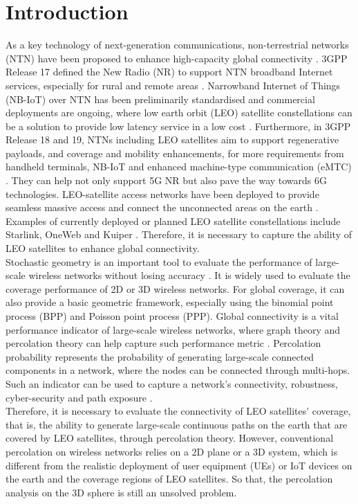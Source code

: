 \documentclass[final]{IEEEtran}
\begin{document}
\section{Introduction} \label{sec:Intro}

As a key technology of next-generation communications, non-terrestrial networks (NTN) have been proposed to enhance high-capacity global connectivity \cite{giordani2020non}. 3GPP Release 17 defined the New Radio (NR) to support NTN broadband Internet services, especially for rural and remote areas \cite{3GPPRelease17}. Narrowband Internet of Things (NB-IoT) over NTN has been preliminarily standardised and commercial deployments are ongoing, where low earth orbit (LEO) satellite constellations can be a solution to provide low latency service in a low cost \cite{3GPPRelease18,liberg2020narrowband}. Furthermore, in 3GPP Release 18 and 19, NTNs including LEO satellites aim to support regenerative payloads, and coverage and mobility enhancements, for more requirements from handheld terminals, NB-IoT and enhanced machine-type communication (eMTC) \cite{10500741}. They can help not only support 5G NR but also pave the way towards 6G technologies. LEO-satellite access networks have been deployed to provide seamless massive access and connect the unconnected areas on the earth \cite{xiao2022leo}. Examples of currently deployed or planned LEO satellite constellations include Starlink, OneWeb and Kuiper \cite{osoro2021techno,voicu2024handover}. Therefore, it is necessary to capture the ability of LEO satellites to enhance global connectivity.  \\
\indent Stochastic geometry is an important tool to evaluate the performance of large-scale wireless networks without losing accuracy \cite{haenggi2012stochastic}. It is widely used to evaluate the coverage performance of 2D or 3D wireless networks. For global coverage, it can also provide a basic geometric framework, especially using the binomial point process (BPP) and Poisson point process (PPP). Global connectivity is a vital performance indicator of large-scale wireless networks, where graph theory and percolation theory can help capture such performance metric \cite{haenggi2009stochastic,haenggi2012stochastic}. Percolation probability represents the probability of generating large-scale connected components in a network, where the nodes can be connected through multi-hops. Such an indicator can be used to capture a network's connectivity, robustness, cyber-security and path exposure \cite{elsawy2023tutorial}.\\
\indent Therefore, it is necessary to evaluate the connectivity of LEO satellites' coverage, that is, the ability to generate large-scale continuous paths on the earth that are covered by LEO satellites, through percolation theory. However, conventional percolation on wireless networks relies on a 2D plane or a 3D system, which is different from the realistic deployment of user equipment (UEs) or IoT devices on the earth and the coverage regions of LEO satellites. So that, the percolation analysis on the 3D sphere is still an unsolved problem.
\end{document}
